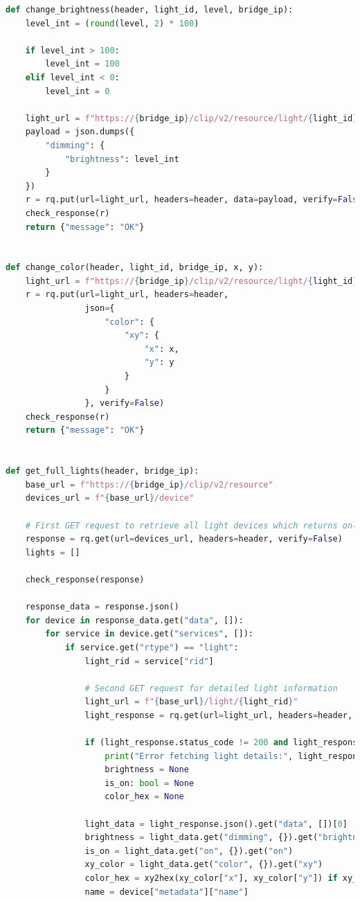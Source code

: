 \documentclass[12pt]{article}
\begin{document}
\begin{lstlisting}[language=Python]
def change_brightness(header, light_id, level, bridge_ip):
    level_int = (round(level, 2) * 100)

    if level_int > 100:
        level_int = 100
    elif level_int < 0:
        level_int = 0

    light_url = f"https://{bridge_ip}/clip/v2/resource/light/{light_id}"
    payload = json.dumps({
        "dimming": {
            "brightness": level_int
        }
    })
    r = rq.put(url=light_url, headers=header, data=payload, verify=False)
    check_response(r)
    return {"message": "OK"}


def change_color(header, light_id, bridge_ip, x, y):
    light_url = f"https://{bridge_ip}/clip/v2/resource/light/{light_id}"
    r = rq.put(url=light_url, headers=header,
                json={
                    "color": {
                        "xy": {
                            "x": x,
                            "y": y
                        }
                    }
                }, verify=False)
    check_response(r)
    return {"message": "OK"}


def get_full_lights(header, bridge_ip):
    base_url = f"https://{bridge_ip}/clip/v2/resource"
    devices_url = f"{base_url}/device"
    
    # First GET request to retrieve all light devices which returns only "rid" and "name" 
    response = rq.get(url=devices_url, headers=header, verify=False)
    lights = []
    
    check_response(response)
    
    response_data = response.json()
    for device in response_data.get("data", []):
        for service in device.get("services", []):
            if service.get("rtype") == "light":
                light_rid = service["rid"]
                
                # Second GET request for detailed light information
                light_url = f"{base_url}/light/{light_rid}"
                light_response = rq.get(url=light_url, headers=header, verify=False)
                
                if (light_response.status_code != 200 and light_response.status_code != 207):
                    print("Error fetching light details:", light_response.status_code, light_response.text)
                    brightness = None
                    is_on: bool = None
                    color_hex = None

                light_data = light_response.json().get("data", [])[0]
                brightness = light_data.get("dimming", {}).get("brightness")
                is_on = light_data.get("on", {}).get("on")
                xy_color = light_data.get("color", {}).get("xy")
                color_hex = xy2hex(xy_color["x"], xy_color["y"]) if xy_color else None
                name = device["metadata"]["name"]


\end{lstlisting}
\end{document}
